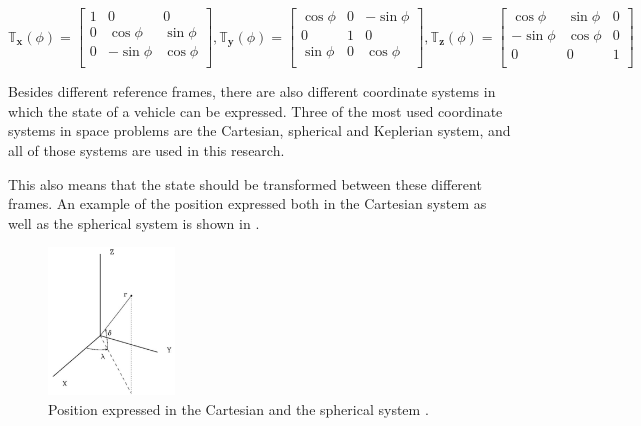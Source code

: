 \begin{equation} \label{eq:allTransMatr}
\mathbb{T}_{\mathbf{x}}(\phi)=\begin{bmatrix}
1 & 0 & 0 \\
0 & \cos\phi & \sin\phi \\
0 & -\sin\phi & \cos\phi \\
\end{bmatrix}, 
\mathbb{T}_{\mathbf{y}}(\phi)=\begin{bmatrix}
\cos\phi & 0 & -\sin\phi \\
0 & 1 & 0\\
\sin\phi & 0 & \cos\phi \\
\end{bmatrix}, 
\mathbb{T}_{\mathbf{z}}(\phi)=\begin{bmatrix}
\cos\phi & \sin\phi & 0\\
- \sin\phi & \cos\phi & 0\\
0 & 0 & 1\\
\end{bmatrix}
\end{equation}


\noindent
Besides different reference frames, there are also different coordinate systems in which the state of a vehicle can be expressed. Three of the most used coordinate systems in space problems are the Cartesian, spherical and Keplerian system, and all of those systems are used in this research. 


This also means that the state should be transformed between these different frames. An example of the position expressed both in the Cartesian system as well as the spherical system is shown in .


\begin{figure}[!ht]
\centering
\includegraphics[width=0.3\textwidth]{figures/reference_frames/sphertocart_noomen2013basic.jpg}
\caption{Position expressed in the Cartesian and the spherical system \cite{noomen2013basic}.}
\label{fig:sphertocart_noomen2013basicFirst}
\end{figure}

